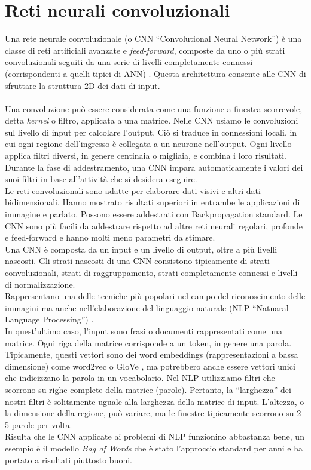 \section{Reti neurali convoluzionali}
\label{sec:cnn}
Una rete neurale convoluzionale (o CNN ``Convolutional Neural Network'') è una classe di reti artificiali avanzate e \emph{feed-forward}, composte da uno o più strati convoluzionali seguiti da una serie di livelli completamente connessi (corrispondenti a quelli tipici di ANN) \cite{kim2014convolutional}. Questa architettura consente alle CNN di sfruttare la struttura 2D dei dati di input.\\\\
Una convoluzione può essere considerata come una funzione a finestra scorrevole, detta \emph{kernel} o filtro, applicata a una matrice. 
Nelle CNN usiamo le convoluzioni sul livello di input per calcolare l'output. Ciò si traduce in connessioni locali, in cui ogni regione dell'ingresso è collegata a un neurone nell'output. Ogni livello applica filtri diversi, in genere centinaia o migliaia, e combina i loro risultati. Durante la fase di addestramento, una CNN impara automaticamente i valori dei suoi filtri in base all'attività che si desidera eseguire. \\
Le reti convoluzionali sono adatte per elaborare dati visivi e altri dati bidimensionali. Hanno mostrato risultati superiori in entrambe le applicazioni di immagine e parlato. Possono essere addestrati con Backpropagation standard. Le CNN sono più facili da addestrare rispetto ad altre reti neurali regolari, profonde e feed-forward e hanno molti meno parametri da stimare.\\
Una CNN è composta da un input e un livello di output, oltre a più livelli nascosti. Gli strati nascosti di una CNN consistono tipicamente di strati convoluzionali, strati di raggruppamento, strati completamente connessi e livelli di normalizzazione.\\
Rappresentano una delle tecniche più popolari nel campo del riconoscimento delle immagini ma anche nell'elaborazione del linguaggio naturale (NLP ``Natuaral Language Processing'') \cite{manning1999foundations,FIXME}.\\
In quest'ultimo caso, l'input sono frasi o documenti rappresentati come una matrice. Ogni riga della matrice corrisponde a un token, in genere una parola. Tipicamente, questi vettori sono dei word embeddings (rappresentazioni a bassa dimensione) come word2vec \cite{mikolov2013distributed} o GloVe \cite{pennington2014glove}, ma potrebbero anche essere vettori unici che indicizzano la parola in un vocabolario. Nel NLP utilizziamo filtri che scorrono su righe complete della matrice (parole). Pertanto, la ``larghezza'' dei nostri filtri è solitamente uguale alla larghezza della matrice di input. L'altezza, o la dimensione della regione, può variare, ma le finestre tipicamente scorrono su 2-5 parole per volta. \\
Risulta che le CNN applicate ai problemi di NLP funzionino abbastanza bene, un esempio è il modello \emph{Bag of Words} che è stato l'approccio standard per anni e ha portato a risultati piuttosto buoni.
